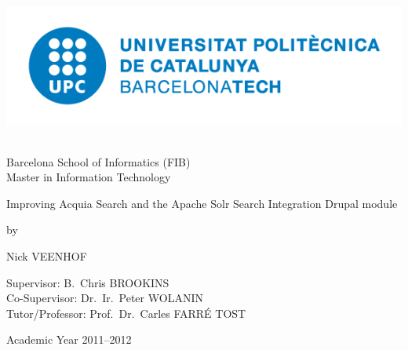 

\begin{titlepage}

\setlength{\hoffset}{-1in}
\setlength{\voffset}{-1in}
\setlength{\topmargin}{1.5cm}
\setlength{\headheight}{0.5cm}
\setlength{\headsep}{1cm}
\setlength{\oddsidemargin}{3cm}
\setlength{\evensidemargin}{3cm}
\setlength{\footskip}{1.5cm}
\enlargethispage{1cm}


\fontsize{12pt}{14pt}
\selectfont

\begin{center}

\includegraphics[height=5cm]{images/logoUPCblau-complet}

\vspace{0.5cm}

Barcelona School of Informatics (FIB)\\
Master in Information Technology\\

\vspace{3.5cm}

\fontsize{17.28pt}{21pt}
\selectfont

Improving Acquia Search and the Apache Solr Search Integration Drupal module\\

\fontsize{12pt}{14pt}
\selectfont

\vspace{.6cm}

by 

\vspace{.4cm}

Nick VEENHOF

\vspace{3.5cm}

Supervisor: B.~Chris BROOKINS\\
Co-Supervisor: Dr.~Ir.~Peter WOLANIN\\
Tutor/Professor: Prof.~Dr.~Carles FARR\'{E} TOST\\

\vspace{2cm}

Academic Year 2011--2012

\end{center}
\end{titlepage}
